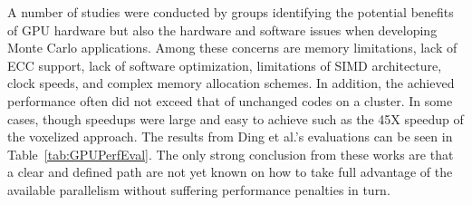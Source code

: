 A number of studies were conducted by groups identifying the potential benefits of GPU hardware but also the hardware and software issues when developing Monte Carlo applications.
%
Among these concerns are memory limitations, lack of ECC support, lack of software optimization, limitations of SIMD architecture, clock speeds, and complex memory allocation schemes.
%
In addition, the achieved performance often did not exceed that of unchanged codes on a cluster.
%
In some cases, though speedups were large and easy to achieve such as the 45X speedup of the voxelized approach. 
%
The results from Ding et al.'s evaluations can be seen in Table~\ref{tab:GPUPerfEval}.
%
The only strong conclusion from these works are that a clear and defined path are not yet known on how to take full advantage of the available parallelism without suffering performance penalties in turn. ~\cite{ding2011evaluation}
